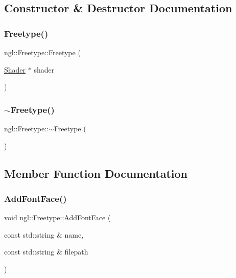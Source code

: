 \subsection{Constructor \& Destructor Documentation}
\mbox{\label{classngl_1_1_freetype_ae4d2dae4184f7f3d6db679978c5330a3}} 
\subsubsection{\texorpdfstring{Freetype()}{Freetype()}}
{\footnotesize\ttfamily ngl\+::\+Freetype\+::\+Freetype (\begin{DoxyParamCaption}\item[{\mbox{\hyperlink{classngl_1_1_shader}{Shader}} $\ast$}]{shader }\end{DoxyParamCaption})\hspace{0.3cm}{\ttfamily [explicit]}}

\mbox{\label{classngl_1_1_freetype_a969f170d5006a1a7ee51f307806038ff}} 
\subsubsection{\texorpdfstring{$\sim$\+Freetype()}{~Freetype()}}
{\footnotesize\ttfamily ngl\+::\+Freetype\+::$\sim$\+Freetype (\begin{DoxyParamCaption}{ }\end{DoxyParamCaption})}



\subsection{Member Function Documentation}
\mbox{\label{classngl_1_1_freetype_a18bd827a8b3fbb169ea4dc7544083851}} 
\subsubsection{\texorpdfstring{Add\+Font\+Face()}{AddFontFace()}}
{\footnotesize\ttfamily void ngl\+::\+Freetype\+::\+Add\+Font\+Face (\begin{DoxyParamCaption}\item[{const std\+::string \&}]{name,  }\item[{const std\+::string \&}]{filepath }\end{DoxyParamCaption})}

